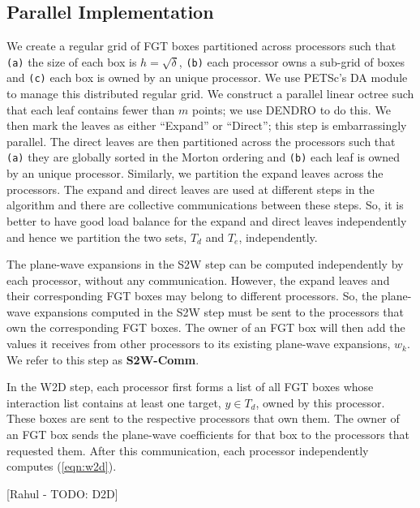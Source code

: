 
\subsection{Parallel Implementation}
\label{sc:parallelnufgt}

We create a regular grid of FGT boxes partitioned across processors such that 
 {\tt{(a)}} the size of each box is $h = \sqrt{\delta}$, {\tt{(b)}} each processor owns a sub-grid of boxes and
 {\tt{(c)}} each box is owned by an unique processor.  We use PETSc's \cite{petsc-user-ref, petsc-home-page} DA
 module to manage this distributed regular grid. We construct a parallel linear octree such that each leaf
 contains fewer than $m$ points; we use DENDRO \cite{dendro} to do this. We then mark the leaves as either
 ``Expand'' or ``Direct''; this step is embarrassingly parallel. The direct leaves are then partitioned across 
 the processors such that {\tt{(a)}} they are globally sorted in the Morton ordering and {\tt{(b)}} each leaf 
 is owned by an unique processor. Similarly, we partition the expand leaves across the processors. The expand
 and direct leaves are used at different steps in the algorithm and there are collective communications between
 these steps. So, it is better to have good load balance for the expand and direct leaves independently and hence
 we partition the two sets, $T_d$ and $T_e$, independently.

The plane-wave expansions in the S2W step can be computed independently by each processor, without any communication.
However, the expand leaves and their corresponding FGT boxes may belong to different processors. So, the plane-wave 
expansions computed in the S2W step must be sent to the processors that own the corresponding FGT boxes. The owner of
an FGT box will then add the values it receives from other processors to its existing plane-wave expansions, $w_k$. We 
refer to this step as {\textbf{S2W-Comm}}.

In the W2D step, each processor first forms a list of all FGT boxes whose interaction list contains at least one 
target, $y \in T_d$, owned by this processor. These boxes are sent to the respective processors that own them. The
owner of an FGT box sends the plane-wave coefficients for that box to the processors that requested them. After this
communication, each processor independently computes (\ref{eqn:w2d}).

[Rahul - TODO: D2D]

